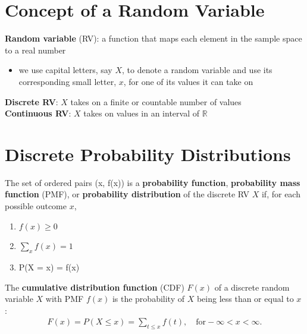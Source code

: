\documentclass[10pt]{article}
\begin{document}
\section{Concept of a Random Variable}
\begin{definition}
    \textbf{Random variable} (RV): a function that maps each element in the sample space to a real number
    \begin{itemize}
        \item we use capital letters, say $X$, to denote a random variable and use its corresponding small letter, $x$, for one of its values it can take on
    \end{itemize}
\end{definition}
\begin{definition}
    \textbf{Discrete RV}: $X$ takes on a finite or countable number of values \\ 
    \textbf{Continuous RV}: $X$ takes on values in an interval of $\mathbb{R}$
\end{definition}

\section{Discrete Probability Distributions}
\begin{definition}
    The set of ordered pairs (x, f(x)) is a \textbf{probability function}, \textbf{probability mass function} (PMF), or \textbf{probability distribution} of the discrete RV $X$ if, for each possible outcome $x$,
    \begin{enumerate}
        \item $f(x) \ge 0$
        \item $\sum_{x} f(x) = 1$
        \item P(X = x) = f(x)
    \end{enumerate}
\end{definition}
\begin{definition}
    The \textbf{cumulative distribution function} (CDF) $F(x)$ of a discrete random variable $X$ with PMF $f(x)$ is the probability of $X$ being less than or equal to $x$ :
    \begin{align*}
        F(x) = P(X \le x) = \sum_{t\le x} f(t), \quad \text{for} - \infty < x < \infty
    .\end{align*}
\end{definition}
\end{document}
